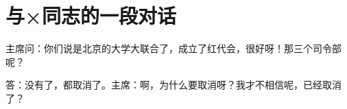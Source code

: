 \section[与×同志的一段对话（一九六七年四月）]{与×同志的一段对话}


主席问：你们说是北京的大学大联合了，成立了红代会，很好呀！那三个司令部呢？

答：没有了，都取消了。主席：啊，为什么要取消呀？我才不相信呢，已经取消了？



